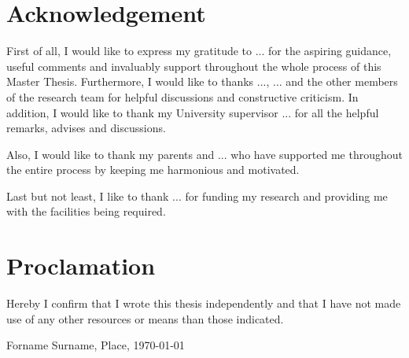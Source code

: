 \documentclass[11pt, a4paper, twoside, openright, final]{book}
\makeatletter
\numberwithin{equation}{chapter}		%
\renewcommand*{\cleardoublepage}{\clearpage\if@twoside \ifodd\c@page\else
\hbox{}%
\thispagestyle{empty}%
\newpage%
\if@twocolumn\hbox{}\newpage\fi\fi\fi}
\newcommand{\1}{\mathbbm{1}}
\makeatother
\begin{document}
\setcounter{page}{1}	%











\cleardoublepage
\chapter*{Acknowledgement}
\label{c:acknowledgement}

First of all, I would like to express my gratitude to ... for the aspiring guidance, useful comments and invaluably support throughout the whole process of this Master Thesis. Furthermore, I would like to thanks ..., ... and the other members of the research team for helpful discussions and constructive criticism. In addition, I would like to thank my University supervisor ... for all the helpful remarks, advises and discussions.

Also, I would like to thank my parents and ... who have supported me throughout the entire process by keeping me harmonious and motivated. 

Last but not least, I like to thank ... for funding my research and providing me with the facilities being required.



\listoffigures



\cleardoublepage





\cleardoublepage
\chapter*{Proclamation}
Hereby I confirm that I wrote this thesis independently and that I have not made use of any other resources or means than those indicated.
\bigskip\bigskip\bigskip\bigskip\bigskip\bigskip\bigskip\bigskip
\begin{flushright}
	Forname Surname, Place, \today
\end{flushright}
\end{document}
